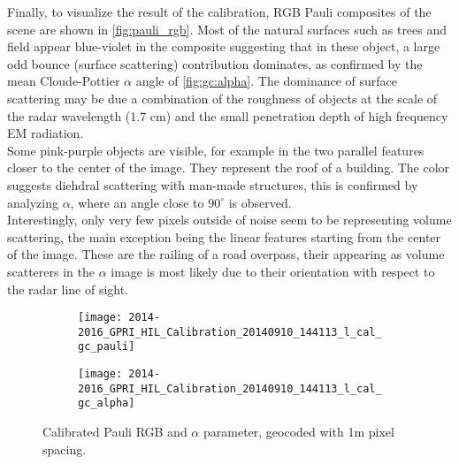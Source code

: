 Finally, to visualize the result of the calibration, RGB Pauli composites of the scene are shown in \autoref{fig:pauli_rgb}. Most of the natural surfaces such as trees and field appear blue-violet in the composite suggesting that in these object, a large odd bounce (surface scattering) contribution dominates, as confirmed by the mean Cloude-Pottier $\alpha$ angle of \autoref{fig:gc:alpha}. The dominance of surface scattering may be due a combination of the roughness of objects at the scale of the radar wavelength (1.7 cm) and the small penetration depth of high frequency EM radiation.\\ Some pink-purple objects are visible, for example in the two parallel features closer to the center of the image. They represent the roof of a building. The color suggests diehdral scattering with man-made structures, this is confirmed by analyzing $\alpha$, where an angle close to $90^\circ$ is observed.\\ 
Interestingly, only very few pixels outside of noise seem to be representing volume scattering, the main exception being the linear features starting from the center of the image. These are the railing of a road overpass, their appearing as volume scatterers in the $\alpha$ image is most likely due to their orientation with respect to the radar line of sight.

\begin{figure}[ht]
	\begin{subfigure}[t]{\columnwidth}
		\texttt{[image: 2014-2016\_GPRI\_HIL\_Calibration\_20140910\_144113\_l\_cal\_gc\_pauli]}
		\label{fig:gc:pauli_rgb}
	\end{subfigure}
	\begin{subfigure}[t]{\columnwidth}
		\texttt{[image: 2014-2016\_GPRI\_HIL\_Calibration\_20140910\_144113\_l\_cal\_gc\_alpha]}
		\label{fig:gc:alpha}
	\end{subfigure}
	\caption{Calibrated Pauli RGB and $\alpha$ parameter, geocoded with 1m pixel spacing.}
	\label{fig:gc}
\end{figure}


